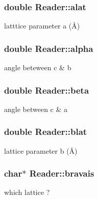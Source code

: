 \subsubsection[{alat}]{\setlength{\rightskip}{0pt plus 5cm}double Reader\+::alat}\label{class_reader_ae27e67c8d78fb8fac565ec079529b589}


latttice parameter a (Å) 

\hypertarget{class_reader_a421cb70a4a8746a68fe2618ed597c5a0}{}
\subsubsection[{alpha}]{\setlength{\rightskip}{0pt plus 5cm}double Reader\+::alpha}\label{class_reader_a421cb70a4a8746a68fe2618ed597c5a0}


angle beteween c \& b 

\hypertarget{class_reader_a47234e1e633f932334c4304cf01824a1}{}
\subsubsection[{beta}]{\setlength{\rightskip}{0pt plus 5cm}double Reader\+::beta}\label{class_reader_a47234e1e633f932334c4304cf01824a1}


angle between c \& a 

\hypertarget{class_reader_a8e2240f9ad9a7c1423e0888e474f4c9e}{}
\subsubsection[{blat}]{\setlength{\rightskip}{0pt plus 5cm}double Reader\+::blat}\label{class_reader_a8e2240f9ad9a7c1423e0888e474f4c9e}


lattice parameter b (Å) 

\hypertarget{class_reader_a9aa6c187535ed940397c836aacfcc0c1}{}
\subsubsection[{bravais}]{\setlength{\rightskip}{0pt plus 5cm}char$\ast$ Reader\+::bravais}\label{class_reader_a9aa6c187535ed940397c836aacfcc0c1}


which lattice ? 

\hypertarget{class_reader_ad10c6e643d5cb651bed0c96790099b51}{}
